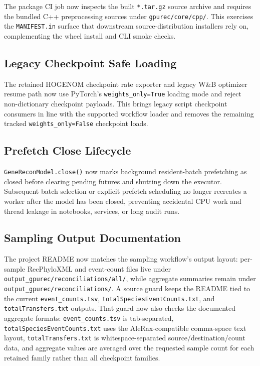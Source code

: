 \documentclass[11pt]{article}
\begin{document}
The package CI job now inspects the built \texttt{*.tar.gz} source archive and
requires the bundled C++ preprocessing sources under
\texttt{gpurec/core/cpp/}.  This exercises the \texttt{MANIFEST.in} surface
that downstream source-distribution installers rely on, complementing the
wheel install and CLI smoke checks.

\subsection{Legacy Checkpoint Safe Loading}

The retained HOGENOM checkpoint rate exporter and legacy W\&B optimizer resume
path now use PyTorch's \texttt{weights\_only=True} loading mode and reject
non-dictionary checkpoint payloads.  This brings legacy script checkpoint
consumers in line with the supported workflow loader and removes the remaining
tracked \texttt{weights\_only=False} checkpoint loads.

\subsection{Prefetch Close Lifecycle}

\texttt{GeneReconModel.close()} now marks background resident-batch prefetching
as closed before clearing pending futures and shutting down the executor.
Subsequent batch selection or explicit prefetch scheduling no longer recreates
a worker after the model has been closed, preventing accidental CPU work and
thread leakage in notebooks, services, or long audit runs.

\subsection{Sampling Output Documentation}

The project README now matches the sampling workflow's output layout:
per-sample RecPhyloXML and event-count files live under
\texttt{output\_gpurec/reconciliations/all/}, while aggregate summaries remain
under \texttt{output\_gpurec/reconciliations/}.  A source guard keeps the
README tied to the current \texttt{event\_counts.tsv},
\texttt{totalSpeciesEventCounts.txt}, and \texttt{totalTransfers.txt} outputs.
That guard now also checks the documented aggregate formats:
\texttt{event\_counts.tsv} is tab-separated,
\texttt{totalSpeciesEventCounts.txt} uses the AleRax-compatible comma-space
text layout, \texttt{totalTransfers.txt} is whitespace-separated
source/destination/count data, and aggregate values are averaged over the
requested sample count for each retained family rather than all checkpoint
families.
\end{document}
